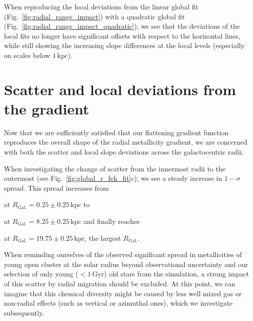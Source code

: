 \documentclass[fleqn,usenatbib]{mnras}
\begin{document}
When reproducing the local deviations from the linear global fit (Fig.~\ref{fig:radial_range_impact}) with a quadratic global fit (Fig.~\ref{fig:radial_range_impact_quadratic}), we see that the deviations of the local fits no longer have significant offsets with respect to the horizontal lines, while still showing the increasing slope differences at the local levels (especially on scales below $1\,\mathrm{kpc}$). 

\section{Scatter and local deviations from the gradient}
\label{sec:scatter_radial_metallicity_gradients}

Now that we are sufficiently satisfied that our flattening gradient function reproduces the overall shape of the radial metallicity gradient, we are concerned with both the scatter and local slope deviations across the galactocentric radii.

When investigating the change of scatter from the innermost radii to the outermost (see Fig.~\ref{fig:global_r_feh_fit}c), we see a steady increase in $1-\sigma$ spread. This spread increases from
\begin{description}
    \item  at $R_\mathrm{Gal.} = 0.25 \pm 0.25\,\mathrm{kpc}$ to
    \item  at $R_\mathrm{Gal.} = 8.25 \pm 0.25\,\mathrm{kpc}$ and finally reaches 
     \item  at $R_\mathrm{Gal.} = 19.75 \pm 0.25\,\mathrm{kpc}$, the largest $R_\mathrm{Gal.}$.
\end{description}

When reminding ourselves of the observed significant spread in metallicities of young open cluster at the solar radius beyond observational uncertainty \citep[e.g.][]{Donor2020, Spina2021} and our selection of only young ($<1\,\mathrm{Gyr}$) old stars from the simulation, a strong impact of this scatter by radial migration should be excluded. At this point, we can imagine that this chemical diversity might be caused by less well mixed gas or non-radial effects (such as vertical or azimuthal ones), which we investigate subsequently.
\end{document}
